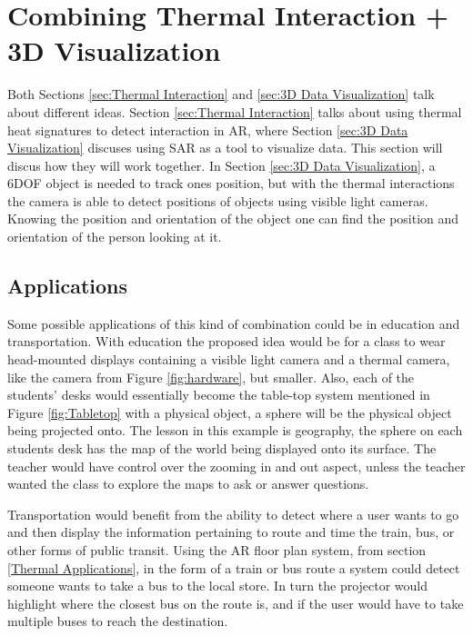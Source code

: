 \documentclass{sig-alternate}
\begin{document}
\section{Combining Thermal Interaction + 3D Visualization}
\label{sec:Joining Together}
Both Sections \ref{sec:Thermal Interaction} and \ref{sec:3D Data Visualization} talk about different ideas. Section \ref{sec:Thermal Interaction} talks about using thermal heat signatures to detect interaction in AR, where Section \ref{sec:3D Data Visualization} discuses using SAR as a tool to visualize data. This section will discus how they will work together. In Section \ref{sec:3D Data Visualization}, a 6DOF object is needed to track ones position, but with the thermal interactions the camera is able to detect positions of objects using visible light cameras. Knowing the position and orientation of the object one can find the position and orientation of the person looking at it.   

\subsection{Applications}
\label{Applications}
Some possible applications of this kind of combination could be in education and transportation. With education the proposed idea would be for a class to wear head-mounted displays containing a visible light camera and a thermal camera, like the camera from Figure \ref{fig:hardware}, but smaller. Also, each of the students' desks would essentially become the table-top system mentioned in Figure \ref{fig:Tabletop} with a physical object, a sphere will be the physical object being projected onto. The lesson in this example is geography, the sphere on each students desk has the map of the world being displayed onto its surface. The teacher would have control over the zooming in and out aspect, unless the teacher wanted the class to explore the maps to ask or answer questions.

Transportation would benefit from the ability to detect where a user wants to go and then display the information pertaining to route and time the train, bus, or other forms of public transit. Using the AR floor plan system, from section \ref{Thermal Applications}, in the form of a train or bus route a system could detect someone wants to take a bus to the local store. In turn the projector would highlight where the closest bus on the route is, and if the user would have to take multiple buses to reach the destination. 
\end{document}
